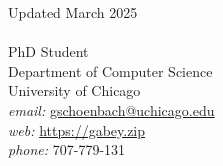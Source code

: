 
\hfill
Updated March 2025
\\
\\
\noindent PhD Student\\
\noindent Department of Computer Science\\
\noindent University of Chicago\\


\noindent \emph{email:} \url{gschoenbach@uchicago.edu}\\
\noindent \emph{web:} \url{https://gabey.zip}\\
\noindent \emph{phone:} 707-779-131


\noindent\makebox[\linewidth]{\rule{\textwidth}{0.4pt}}


